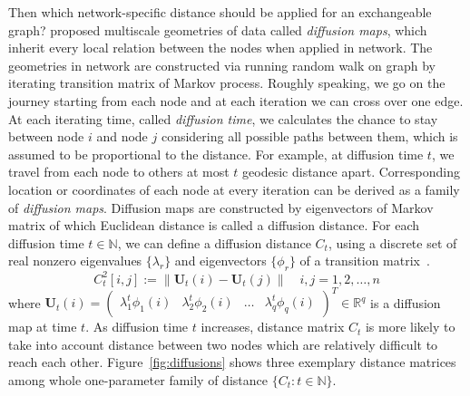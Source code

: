 \documentclass[12pt]{article}
\theoremstyle{definition}
\begin{document}
Then which network-specific distance should be applied for an exchangeable graph? \cite{coifman2006diffusion} proposed multiscale geometries of data called \textit{diffusion maps}, which inherit every local relation between the nodes when applied in network. The geometries in network are constructed via running random walk on graph by iterating transition matrix of Markov process. Roughly speaking, we go on the journey starting from each node and at each iteration we can cross over one edge. At each iterating time, called \textit{diffusion time}, we calculates the chance to stay between node $i$ and node $j$ considering all possible paths between them, which is assumed to be proportional to the distance. For example, at diffusion time $t$, we travel from each node to others at most $t$ geodesic distance apart. Corresponding location or coordinates of each node at every iteration can be derived as a family of \textit{diffusion maps}. Diffusion maps are constructed by eigenvectors of Markov matrix of which Euclidean distance is called a diffusion distance. For each diffusion time $t \in \mathbb{N}$, we can define a diffusion distance $C_{t}$, using a discrete set of real nonzero eigenvalues $\{ \lambda_{r} \}$ and eigenvectors $\{ \phi_{r}  \}$ of a transition matrix~\citep{coifman2006diffusion,lafon2006diffusion}. 
\begin{equation}
\label{eq:diffusion}
C^2_{t}[i,j]  :=   \parallel \mathbf{U}_{t}(i) - \mathbf{U}_{t}(j) \parallel   \quad i,j = 1,2, \ldots , n
\end{equation}
where $\mathbf{U}_{t}(i) = \begin{pmatrix} \lambda^{t}_{1} \phi_{1}(i) & \lambda^{t}_{2} \phi_{2} (i)  & \ldots & \lambda^{t}_{q} \phi_{q}(i) \end{pmatrix}^{T} \in \mathbb{R}^{q}$ is a diffusion map at time $t$. As diffusion time $t$ increases, distance matrix $C_{t}$ is more likely to take into account distance between two nodes which are relatively difficult to reach each other. Figure~\ref{fig:diffusions} shows three exemplary distance matrices among whole one-parameter family of distance $\{ C_{t} : t \in \mathbb{N} \}$. 
\end{document}

